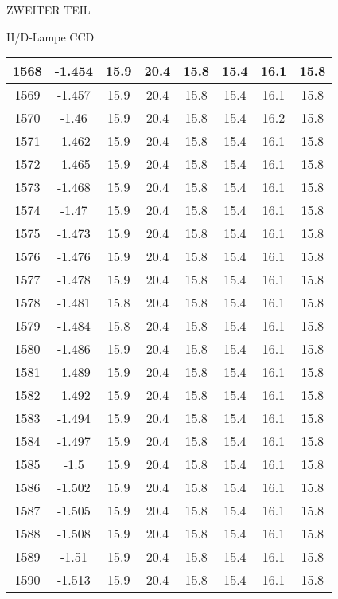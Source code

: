 \begin{appendix}
\begin{chapter}{ZWEITER TEIL}
\begin{section}{H/D-Lampe CCD}
\begin{scriptsize}
\begin{longtable}[htbp]{|c|c|c|c|c|c|c|c|}
            1568 & -1.454 & 15.9 & 20.4 & 15.8 & 15.4 & 16.1 & 15.8 \\ \hline
            1569 & -1.457 & 15.9 & 20.4 & 15.8 & 15.4 & 16.1 & 15.8 \\ \hline
            1570 & -1.46 & 15.9 & 20.4 & 15.8 & 15.4 & 16.2 & 15.8 \\ \hline
            1571 & -1.462 & 15.9 & 20.4 & 15.8 & 15.4 & 16.1 & 15.8 \\ \hline
            1572 & -1.465 & 15.9 & 20.4 & 15.8 & 15.4 & 16.1 & 15.8 \\ \hline
            1573 & -1.468 & 15.9 & 20.4 & 15.8 & 15.4 & 16.1 & 15.8 \\ \hline
            1574 & -1.47 & 15.9 & 20.4 & 15.8 & 15.4 & 16.1 & 15.8 \\ \hline
            1575 & -1.473 & 15.9 & 20.4 & 15.8 & 15.4 & 16.1 & 15.8 \\ \hline
            1576 & -1.476 & 15.9 & 20.4 & 15.8 & 15.4 & 16.1 & 15.8 \\ \hline
            1577 & -1.478 & 15.9 & 20.4 & 15.8 & 15.4 & 16.1 & 15.8 \\ \hline
            1578 & -1.481 & 15.8 & 20.4 & 15.8 & 15.4 & 16.1 & 15.8 \\ \hline
            1579 & -1.484 & 15.8 & 20.4 & 15.8 & 15.4 & 16.1 & 15.8 \\ \hline
            1580 & -1.486 & 15.9 & 20.4 & 15.8 & 15.4 & 16.1 & 15.8 \\ \hline
            1581 & -1.489 & 15.9 & 20.4 & 15.8 & 15.4 & 16.1 & 15.8 \\ \hline
            1582 & -1.492 & 15.9 & 20.4 & 15.8 & 15.4 & 16.1 & 15.8 \\ \hline
            1583 & -1.494 & 15.9 & 20.4 & 15.8 & 15.4 & 16.1 & 15.8 \\ \hline
            1584 & -1.497 & 15.9 & 20.4 & 15.8 & 15.4 & 16.1 & 15.8 \\ \hline
            1585 & -1.5 & 15.9 & 20.4 & 15.8 & 15.4 & 16.1 & 15.8 \\ \hline
            1586 & -1.502 & 15.9 & 20.4 & 15.8 & 15.4 & 16.1 & 15.8 \\ \hline
            1587 & -1.505 & 15.9 & 20.4 & 15.8 & 15.4 & 16.1 & 15.8 \\ \hline
            1588 & -1.508 & 15.9 & 20.4 & 15.8 & 15.4 & 16.1 & 15.8 \\ \hline
            1589 & -1.51 & 15.9 & 20.4 & 15.8 & 15.4 & 16.1 & 15.8 \\ \hline
            1590 & -1.513 & 15.9 & 20.4 & 15.8 & 15.4 & 16.1 & 15.8 \\ \hline

\end{longtable}
\end{scriptsize}
\end{section}
\end{chapter}
\end{appendix}
